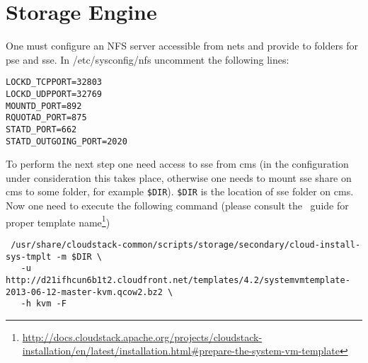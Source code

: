 \section{Storage Engine}
One must configure an NFS server accessible from \acrshort{nets} and provide to folders for \acrshort{pse} and \acrshort{sse}.
In /etc/sysconfig/nfs uncomment the following lines:
\begin{lstlisting}
LOCKD_TCPPORT=32803
LOCKD_UDPPORT=32769
MOUNTD_PORT=892
RQUOTAD_PORT=875
STATD_PORT=662
STATD_OUTGOING_PORT=2020
\end{lstlisting}

To perform the next step one need access to \acrshort{sse} from \acrshort{cms} (in the configuration under consideration this takes place, otherwise one needs to mount \acrshort{sse} share on \acrshort{cms} to some folder, for example \texttt{\$DIR}).  
\texttt{\$DIR} is the location of \acrshort{sse} folder on \acrshort{cms}.
Now one need to execute the following command (please consult the \cstack\ guide for proper template name\footnote{\url{http://docs.cloudstack.apache.org/projects/cloudstack-installation/en/latest/installation.html\#prepare-the-system-vm-template}})
\begin{lstlisting}
 /usr/share/cloudstack-common/scripts/storage/secondary/cloud-install-sys-tmplt -m $DIR \
   -u http://d21ifhcun6b1t2.cloudfront.net/templates/4.2/systemvmtemplate-2013-06-12-master-kvm.qcow2.bz2 \
   -h kvm -F
\end{lstlisting}
